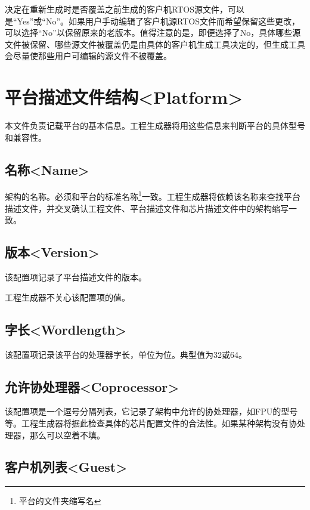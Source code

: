 决定在重新生成时是否覆盖之前生成的客户机RTOS源文件，可以是``Yes''或``No''。如果用户手动编辑了客户机源RTOS文件而希望保留这些更改，可以选择``No''以保留原来的老版本。值得注意的是，即便选择了No，具体哪些源文件被保留、哪些源文件被覆盖仍是由具体的客户机生成工具决定的，但生成工具会尽量使那些用户可编辑的源文件不被覆盖。


\section{平台描述文件结构<Platform>{}}\label{sec:5-4}

本文件负责记载平台的基本信息。工程生成器将用这些信息来判断平台的具体型号和兼容性。

\subsection{名称<Name>{}}\label{subsec:5-4-1}

架构的名称。必须和平台的标准名称\footnote{平台的文件夹缩写名}一致。工程生成器将依赖该名称来查找平台描述文件，并交叉确认工程文件、平台描述文件和芯片描述文件中的架构缩写一致。

\subsection{版本<Version>{}}\label{subsec:5-4-2}

该配置项记录了平台描述文件的版本。

工程生成器不关心该配置项的值。

\subsection{字长<Wordlength>{}}\label{subsec:5-4-3}

该配置项记录该平台的处理器字长，单位为位。典型值为32或64。

\subsection{允许协处理器<Coprocessor>{}}\label{subsec:5-4-4}

该配置项是一个逗号分隔列表，它记录了架构中允许的协处理器，如FPU的型号等。工程生成器将据此检查具体的芯片配置文件的合法性。如果某种架构没有协处理器，那么可以空着不填。

\subsection{客户机列表<Guest>{}}\label{subsec:5-4-5}

